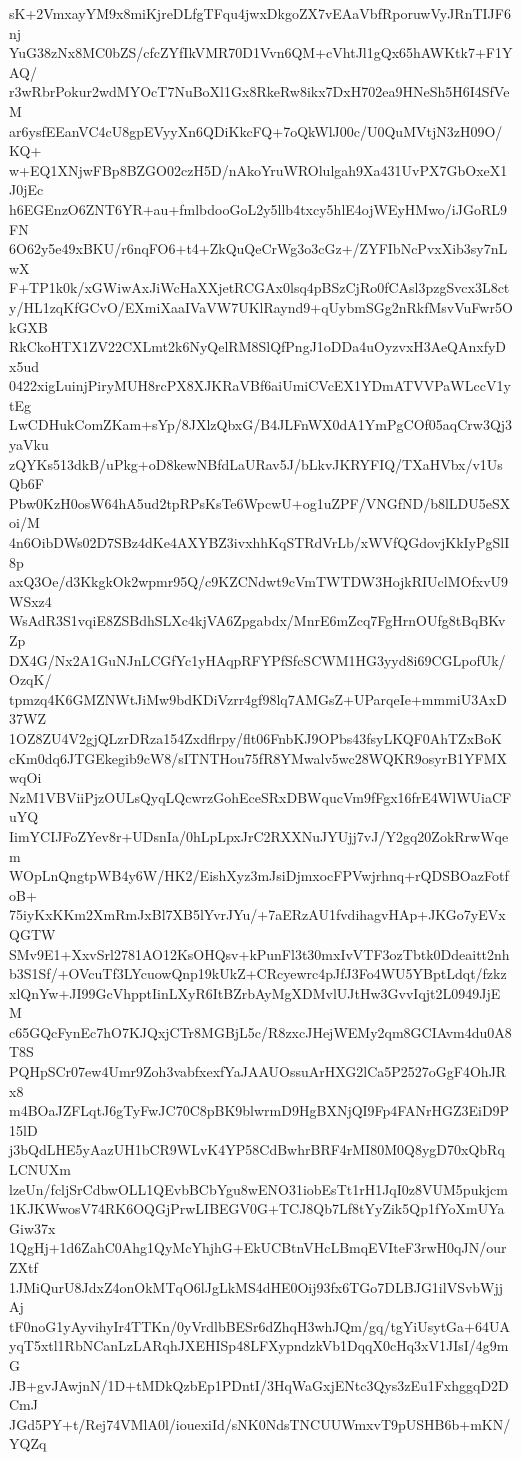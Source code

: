 sK+2VmxayYM9x8miKjreDLfgTFqu4jwxDkgoZX7vEAaVbfRporuwVyJRnTIJF6nj
YuG38zNx8MC0bZS/cfcZYfIkVMR70D1Vvn6QM+cVhtJl1gQx65hAWKtk7+F1YAQ/
r3wRbrPokur2wdMYOcT7NuBoXl1Gx8RkeRw8ikx7DxH702ea9HNeSh5H6I4SfVeM
ar6ysfEEanVC4cU8gpEVyyXn6QDiKkcFQ+7oQkWlJ00c/U0QuMVtjN3zH09O/KQ+
w+EQ1XNjwFBp8BZGO02czH5D/nAkoYruWROlulgah9Xa431UvPX7GbOxeX1J0jEc
h6EGEnzO6ZNT6YR+au+fmlbdooGoL2y5llb4txcy5hlE4ojWEyHMwo/iJGoRL9FN
6O62y5e49xBKU/r6nqFO6+t4+ZkQuQeCrWg3o3cGz+/ZYFIbNcPvxXib3sy7nLwX
F+TP1k0k/xGWiwAxJiWcHaXXjetRCGAx0lsq4pBSzCjRo0fCAsl3pzgSvcx3L8ct
y/HL1zqKfGCvO/EXmiXaaIVaVW7UKlRaynd9+qUybmSGg2nRkfMsvVuFwr5OkGXB
RkCkoHTX1ZV22CXLmt2k6NyQelRM8SlQfPngJ1oDDa4uOyzvxH3AeQAnxfyDx5ud
0422xigLuinjPiryMUH8rcPX8XJKRaVBf6aiUmiCVcEX1YDmATVVPaWLccV1ytEg
LwCDHukComZKam+sYp/8JXlzQbxG/B4JLFnWX0dA1YmPgCOf05aqCrw3Qj3yaVku
zQYKs513dkB/uPkg+oD8kewNBfdLaURav5J/bLkvJKRYFIQ/TXaHVbx/v1UsQb6F
Pbw0KzH0osW64hA5ud2tpRPsKsTe6WpcwU+og1uZPF/VNGfND/b8lLDU5eSXoi/M
4n6OibDWs02D7SBz4dKe4AXYBZ3ivxhhKqSTRdVrLb/xWVfQGdovjKkIyPgSlI8p
axQ3Oe/d3KkgkOk2wpmr95Q/c9KZCNdwt9cVmTWTDW3HojkRIUclMOfxvU9WSxz4
WsAdR3S1vqiE8ZSBdhSLXc4kjVA6Zpgabdx/MnrE6mZcq7FgHrnOUfg8tBqBKvZp
DX4G/Nx2A1GuNJnLCGfYc1yHAqpRFYPfSfcSCWM1HG3yyd8i69CGLpofUk/OzqK/
tpmzq4K6GMZNWtJiMw9bdKDiVzrr4gf98lq7AMGsZ+UParqeIe+mmmiU3AxD37WZ
1OZ8ZU4V2gjQLzrDRza154Zxdflrpy/flt06FnbKJ9OPbs43fsyLKQF0AhTZxBoK
cKm0dq6JTGEkegib9cW8/sITNTHou75fR8YMwalv5wc28WQKR9osyrB1YFMXwqOi
NzM1VBViiPjzOULsQyqLQcwrzGohEceSRxDBWqucVm9fFgx16frE4WlWUiaCFuYQ
IimYCIJFoZYev8r+UDsnIa/0hLpLpxJrC2RXXNuJYUjj7vJ/Y2gq20ZokRrwWqem
WOpLnQngtpWB4y6W/HK2/EishXyz3mJsiDjmxocFPVwjrhnq+rQDSBOazFotfoB+
75iyKxKKm2XmRmJxBl7XB5lYvrJYu/+7aERzAU1fvdihagvHAp+JKGo7yEVxQGTW
SMv9E1+XxvSrl2781AO12KsOHQsv+kPunFl3t30mxIvVTF3ozTbtk0Ddeaitt2nh
b3S1Sf/+OVcuTf3LYcuowQnp19kUkZ+CRcyewrc4pJfJ3Fo4WU5YBptLdqt/fzkz
xlQnYw+JI99GcVhpptIinLXyR6ItBZrbAyMgXDMvlUJtHw3GvvIqjt2L0949JjEM
c65GQcFynEc7hO7KJQxjCTr8MGBjL5c/R8zxcJHejWEMy2qm8GCIAvm4du0A8T8S
PQHpSCr07ew4Umr9Zoh3vabfxexfYaJAAUOssuArHXG2lCa5P2527oGgF4OhJRx8
m4BOaJZFLqtJ6gTyFwJC70C8pBK9blwrmD9HgBXNjQI9Fp4FANrHGZ3EiD9P15lD
j3bQdLHE5yAazUH1bCR9WLvK4YP58CdBwhrBRF4rMI80M0Q8ygD70xQbRqLCNUXm
lzeUn/fcljSrCdbwOLL1QEvbBCbYgu8wENO31iobEsTt1rH1JqI0z8VUM5pukjcm
1KJKWwosV74RK6OQGjPrwLIBEGV0G+TCJ8Qb7Lf8tYyZik5Qp1fYoXmUYaGiw37x
1QgHj+1d6ZahC0Ahg1QyMcYhjhG+EkUCBtnVHcLBmqEVIteF3rwH0qJN/ourZXtf
1JMiQurU8JdxZ4onOkMTqO6lJgLkMS4dHE0Oij93fx6TGo7DLBJG1ilVSvbWjjAj
tF0noG1yAyvihyIr4TTKn/0yVrdlbBESr6dZhqH3whJQm/gq/tgYiUsytGa+64UA
yqT5xtl1RbNCanLzLARqhJXEHISp48LFXypndzkVb1DqqX0cHq3xV1JIsI/4g9mG
JB+gvJAwjnN/1D+tMDkQzbEp1PDntI/3HqWaGxjENtc3Qys3zEu1FxhggqD2DCmJ
JGd5PY+t/Rej74VMlA0l/iouexiId/sNK0NdsTNCUUWmxvT9pUSHB6b+mKN/YQZq
